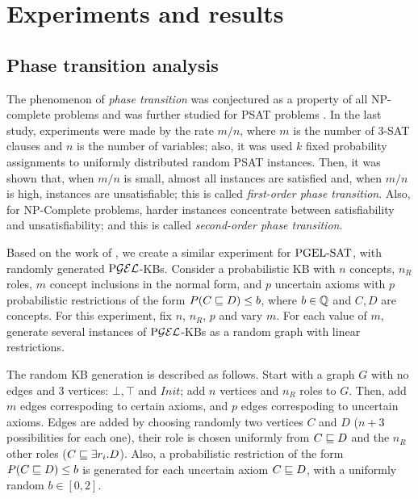 
\chapter{Experiments and results}
\label{cap:experiments}

\section{Phase transition analysis}
\label{sec:phase-trans}

The phenomenon of \emph{phase transition} was conjectured as a property of all NP-complete problems \citep{cheeseman1991really} and was further studied for PSAT problems \citep{Finger2011ProbabilisticSL}. In the last study, experiments were made by the rate $m/n$, where $m$ is the number of 3-SAT clauses and $n$ is the number of variables; also, it was used $k$ fixed probability assignments to uniformly distributed random PSAT instances. Then, it was shown that, when $m/n$ is small, almost all instances are satisfied and, when $m/n$ is high, instances are unsatisfiable; this is called \emph{first-order phase transition}. Also, for NP-Complete problems, harder instances concentrate between satisfiability and unsatisfiability; and this is called \emph{second-order phase transition}.

Based on the work of \citeauthor{Finger2011ProbabilisticSL}, we create a similar experiment for $\text{PGEL-SAT}$, with randomly generated $\text{P}\mathcal{GEL}$-KBs. Consider a probabilistic KB with $n$ concepts, $n_R$ roles, $m$ concept inclusions in the normal form, and $p$ uncertain axioms with $p$ probabilistic restrictions of the form $P(C \sqsubseteq D) \leq b$, where $b \in \mathbb{Q}$ and $C, D$ are concepts. For this experiment, fix $n$, $n_R$, $p$ and vary $m$. For each value of $m$, generate several instances of $\text{P}\mathcal{GEL}$-KBs as a random graph with linear restrictions.

The random KB generation is described as follows. Start with a graph $G$ with no edges and 3 vertices: $\bot, \top$ and $Init$; add $n$ vertices and $n_R$ roles to $G$. Then, add $m$ edges correspoding to certain axioms, and $p$ edges correspoding to uncertain axioms. Edges are added by choosing randomly two vertices $C$ and $D$ ($n+3$ possibilities for each one), their role is chosen uniformly from $C \sqsubseteq D$ and the $n_R$ other roles ($C \sqsubseteq \exists r_i.D$). Also, a probabilistic restriction of the form $P(C \sqsubseteq D) \leq b$ is generated for each uncertain axiom $C \sqsubseteq D$, with a uniformly random $b \in [0, 2]$.

